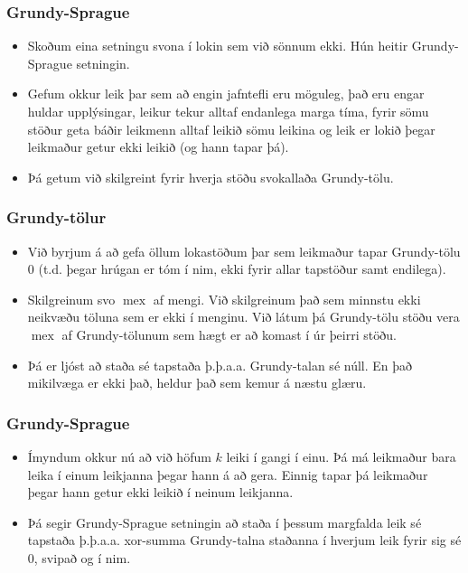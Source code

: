 \documentclass{beamer}
\begin{document}
\begin{frame}
\frametitle{Grundy-Sprague}

\begin{itemize}

\item<1-> Skoðum eina setningu svona í lokin sem við sönnum ekki. Hún heitir Grundy-Sprague setningin.

\item<2-> Gefum okkur leik þar sem að engin jafntefli eru möguleg, það eru engar huldar upplýsingar, leikur tekur alltaf endanlega marga tíma, fyrir sömu stöður geta báðir leikmenn alltaf leikið sömu leikina og leik er lokið þegar leikmaður getur ekki leikið (og hann tapar þá).

\item<3-> Þá getum við skilgreint fyrir hverja stöðu svokallaða Grundy-tölu. 

\end{itemize}

\end{frame}

\begin{frame}
\frametitle{Grundy-tölur}

\begin{itemize}

\item<1-> Við byrjum á að gefa öllum lokastöðum þar sem leikmaður tapar Grundy-tölu 0 (t.d. þegar hrúgan er tóm í nim, ekki fyrir allar tapstöður samt endilega).

\item<2-> Skilgreinum svo $\operatorname{mex}$ af mengi. Við skilgreinum það sem minnstu ekki neikvæðu töluna sem er ekki í menginu. Við látum þá Grundy-tölu stöðu vera $\operatorname{mex}$ af Grundy-tölunum sem hægt er að komast í úr þeirri stöðu.

\item<3-> Þá er ljóst að staða sé tapstaða þ.þ.a.a. Grundy-talan sé núll. En það mikilvæga er ekki það, heldur það sem kemur á næstu glæru.

\end{itemize}

\end{frame}

\begin{frame}
\frametitle{Grundy-Sprague}

\begin{itemize}

\item<1-> Ímyndum okkur nú að við höfum $k$ leiki í gangi í einu. Þá má leikmaður bara leika í einum leikjanna þegar hann á að gera. Einnig tapar þá leikmaður þegar hann getur ekki leikið í neinum leikjanna.

\item<2-> Þá segir Grundy-Sprague setningin að staða í þessum margfalda leik sé tapstaða þ.þ.a.a. xor-summa Grundy-talna staðanna í hverjum leik fyrir sig sé $0$, svipað og í nim.

\end{itemize}

\end{frame}
\end{document}
